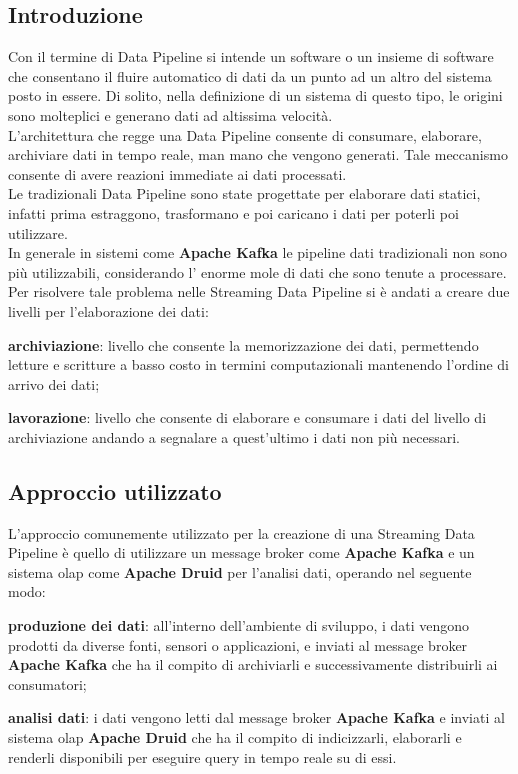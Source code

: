 \subsection{Introduzione}
Con il termine di \gls{Data Pipeline}{} si intende un software o un insieme di software che consentano il fluire automatico
di dati da un punto ad un altro del sistema posto in essere. 
Di solito, nella definizione di un sistema di questo tipo, le origini sono molteplici e generano
dati ad altissima velocità.\\
L’architettura che regge una \gls{Data Pipeline}{} consente di consumare, elaborare, archiviare
dati in tempo reale, man mano che vengono generati. Tale meccanismo consente di avere reazioni immediate ai dati processati. \\
Le tradizionali \gls{Data Pipeline}{} sono state progettate per elaborare dati statici, infatti prima estraggono, trasformano e poi caricano i dati per 
poterli poi utilizzare.\\
In generale in sistemi come \textbf{Apache Kafka} le pipeline dati tradizionali non sono più utilizzabili, considerando 
l' enorme mole di dati che sono tenute a processare.\\
\noindent
Per risolvere tale problema nelle Streaming \gls{Data Pipeline}{} si è andati a creare due livelli per l'elaborazione dei dati: 
\begin{list}{*}
    \item \textbf{archiviazione}: livello che consente la memorizzazione dei dati, permettendo letture e scritture a basso costo in termini computazionali mantenendo l’ordine di arrivo
    dei dati;
    \item \item \textbf{lavorazione}: livello che consente di elaborare e consumare i dati del livello di archiviazione andando a segnalare
    a quest’ultimo i dati non più necessari.
\end{list}

\subsection{Approccio utilizzato}
L'approccio comunemente utilizzato per la creazione di una Streaming \gls{Data Pipeline}{} è quello di utilizzare un \gls{message broker}{} come \textbf{Apache Kafka} e un sistema \gls{olap}{} come \textbf{Apache Druid} per l'analisi dati, operando nel seguente modo:\\
\begin{list}{*}
    \item \textbf{produzione dei dati}: all'interno dell'ambiente di sviluppo, i dati vengono prodotti da diverse fonti, sensori o applicazioni, e inviati al \gls{message broker}{} \textbf{Apache Kafka} 
    che ha il compito di archiviarli e successivamente distribuirli ai consumatori;
    \item \item \textbf{analisi dati}: i dati vengono letti dal \gls{message broker}{} \textbf{Apache Kafka} e inviati al sistema \gls{olap}{} \textbf{Apache Druid} che ha il compito di indicizzarli, elaborarli e renderli disponibili per eseguire query in tempo reale su di essi.
\end{list}

\newpage
\pagestyle{empty}
\null %
\newpage